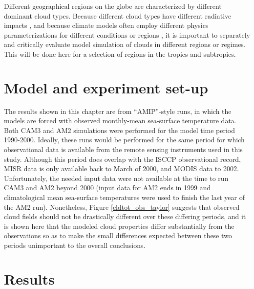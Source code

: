 Different geographical regions on the globe are characterized by different dominant cloud types. Because different cloud types have different radiative impacts \citep{dhuria_and_kyle_1990,hartmann_and_michelsen_1993}, and because climate models often employ different physics parameterizations for different conditions or regions \citep[e.g.,][]{cam3_description}, it is important to separately and critically evaluate model simulation of clouds in different regions or regimes. This will be done here for a selection of regions in the tropics and subtropics.

\section{Model and experiment set-up}
The results shown in this chapter are from ``AMIP''-style runs, in which the models are forced with observed monthly-mean sea-surface temperature data. Both CAM3 and AM2 simulations were performed for the model time period 1990-2000. Ideally, these runs would be performed for the same period for which observational data is available from the remote sensing instruments used in this study. Although this period does overlap with the ISCCP observational record, MISR data is only available back to March of 2000, and MODIS data to 2002. Unfortunately, the needed input data were not available at the time to run CAM3 and AM2 beyond 2000 (input data for AM2 ends in 1999 and climatological mean sea-surface temperatures were used to finish the last year of the AM2 run). Nonetheless, Figure \ref{cldtot_obs_taylor} suggests that observed cloud fields should not be drastically different over these differing periods, and it is shown here that the modeled cloud properties differ substantially from the observations so as to make the small differences expected between these two periods unimportant to the overall conclusions.

\section{Results}
